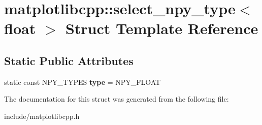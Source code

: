 \hypertarget{structmatplotlibcpp_1_1select__npy__type_3_01float_01_4}{}\section{matplotlibcpp\+:\+:select\+\_\+npy\+\_\+type$<$ float $>$ Struct Template Reference}
\label{structmatplotlibcpp_1_1select__npy__type_3_01float_01_4}
\subsection*{Static Public Attributes}
\begin{DoxyCompactItemize}
\item 
static const N\+P\+Y\+\_\+\+T\+Y\+P\+ES {\bfseries type} = N\+P\+Y\+\_\+\+F\+L\+O\+AT\hypertarget{structmatplotlibcpp_1_1select__npy__type_3_01float_01_4_a7bca025a3f0cb143e566e0f575bf7f6b}{}\label{structmatplotlibcpp_1_1select__npy__type_3_01float_01_4_a7bca025a3f0cb143e566e0f575bf7f6b}

\end{DoxyCompactItemize}


The documentation for this struct was generated from the following file\+:\begin{DoxyCompactItemize}
\item 
include/matplotlibcpp.\+h\end{DoxyCompactItemize}
